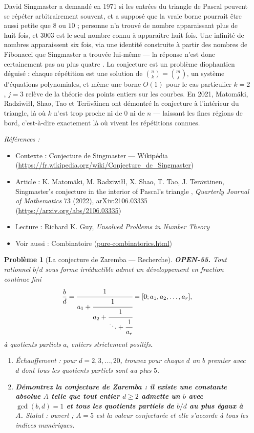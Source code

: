 \documentclass[11pt]{article}
\newtheorem{problem}{Problème}
\newenvironment{refs}{\par\small\noindent\emph{Références :}\begin{itemize}\setlength\itemsep{0pt}}{\end{itemize}\normalsize}
\begin{document}
\noindent David Singmaster a demandé en 1971 si les entrées du triangle de Pascal
peuvent se répéter arbitrairement souvent, et a supposé que la vraie borne pourrait être
aussi petite que $ 8 $ ou $ 10 $ ; personne n'a trouvé de nombre apparaissant plus de
huit fois, et $ 3003 $ est le seul nombre connu à apparaître huit fois. Une infinité de
nombres apparaissent six fois, via une identité construite à partir des nombres de
Fibonacci que Singmaster a trouvée lui-même --- la réponse n'est donc certainement pas \og{} au
plus quatre \fg{}. La conjecture est un problème diophantien déguisé : chaque répétition est
une solution de $ \binom{n}{k} = \binom{m}{j} $, un système d'équations polynomiales, et
même une borne $ O(1) $ pour le cas particulier $ k = 2 $, $ j = 3 $ relève de la
théorie des points entiers sur les courbes. En 2021, Matomäki, Radziwi\l{}\l{}, Shao, Tao et
Teräväinen ont démontré la conjecture à l'intérieur du triangle, là où $ k $ n'est trop
proche ni de $ 0 $ ni de $ n $ --- laissant les fines régions de bord, c'est-à-dire
exactement là où vivent les répétitions connues.

\begin{refs}
\item Contexte : Conjecture de Singmaster --- Wikipédia (\url{https://fr.wikipedia.org/wiki/Conjecture_de_Singmaster})
\item Article : K. Matomäki, M. Radziwi\l{}\l{}, X. Shao, T. Tao, J. Teräväinen, \og{} Singmaster's conjecture in the interior of Pascal's triangle \fg{}, \textit{Quarterly Journal of Mathematics} 73 (2022), arXiv:2106.03335 (\url{https://arxiv.org/abs/2106.03335})
\item Lecture : Richard K. Guy, \textit{Unsolved Problems in Number Theory}
\item Voir aussi : Combinatoire (\url{pure-combinatorics.html})
\end{refs}

\bigskip

\begin{problem}[{La conjecture de Zaremba --- Recherche}]
\textbf{OPEN-55.} Tout rationnel $ b/d $ sous forme irréductible admet un
développement en fraction continue fini
\[ \frac{b}{d} = \cfrac{1}{a_1 + \cfrac{1}{a_2 + \cfrac{1}{\ddots + \cfrac{1}{a_r}}}}
= [0; a_1, a_2, \dots, a_r] , \]
à quotients partiels $ a_i $ entiers strictement positifs.
\begin{enumerate}
\item[(a)] Échauffement : pour $ d = 2, 3, \dots, 20 $, trouvez pour chaque $ d $ un $ b $
premier avec $ d $ dont tous les quotients partiels sont au plus $ 5 $.
\item[(b)] \textbf{Démontrez la conjecture de Zaremba : il existe une constante absolue $ A $ telle
que tout entier $ d \geq 2 $ admette un $ b $ avec $ \gcd(b,d) = 1 $ et tous les
quotients partiels de $ b/d $ au plus égaux à $ A $.} Statut : ouvert ;
$ A = 5 $ est la valeur conjecturée et elle s'accorde à tous les indices numériques.
\end{enumerate}

\end{problem}
\end{document}
